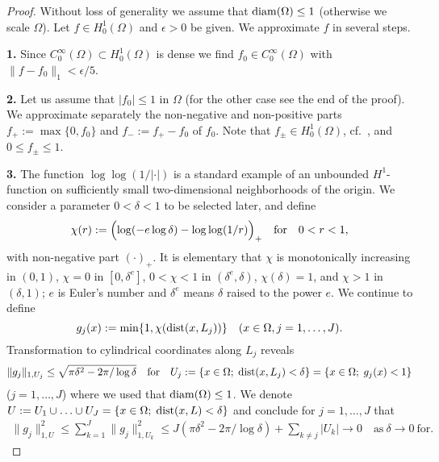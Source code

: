 \documentclass[11pt]{article}
\begin{document}
\begin{proof}
Without loss of generality we assume that $\operatorname{diam}(\Omega)\le 1$ (otherwise we
scale $\Omega$).
Let $f\in H^1_0(\Omega)$ and $\epsilon>0$ be given.
We approximate $f$ in several steps.

{\bf 1.} Since $C^\infty_0(\Omega)\subset H^1_0(\Omega)$ is dense
we find $f_0\in C^\infty_0(\Omega)$ with $\|f-f_0\|_1<\epsilon/5$.

{\bf 2.} Let us assume that $|f_0|\le 1$ in $\Omega$ (for the other case see the end of the proof).
We approximate separately the non-negative and non-positive parts
$f_+:=\max\{0,f_0\}$ and $f_-:=f_+-f_0$ of $f_0$.
Note that $f_\pm\in H^1_0(\Omega)$, cf.~\cite[Theorem~4.4(iii)]{EvansG_15_MTF},
and $0\le f_\pm\le 1$.

{\bf 3.} The function $\log\log(1/|\cdot|)$ is a standard
example of an unbounded $H^1$-function on sufficiently small
two-dimensional neighborhoods of the origin.
We consider a parameter $0<\delta<1$ to be selected later, and define
\[
   \chi(r):=\Bigl(\log(-e\log\delta)-\log\log(1/r)\Bigr)_+
   \quad\text{for}\quad 0<r<1,
\]
with non-negative part $(\cdot)_+$.
It is elementary that $\chi$ is monotonically increasing in $(0,1)$,
$\chi=0$ in $[0,\delta^e]$, $0<\chi<1$ in $(\delta^e,\delta)$, $\chi(\delta)=1$,
and $\chi>1$ in $(\delta,1)$;
$e$ is Euler's number and $\delta^e$ means $\delta$ raised to the power $e$.
We continue to define
\[
   g_j(x):=\min\{1,\chi(\operatorname{dist}(x,L_j))\} \quad (x\in\Omega, j=1,\ldots,J).
\]
Transformation to cylindrical coordinates along $L_j$ reveals
\[
   \|g_j\|_{1,U_j}\le \sqrt{\pi\delta^2-2\pi/\log\delta}\quad\text{for}\quad
   U_j:=\{x\in\Omega;\;\operatorname{dist}(x,L_j)<\delta\} = \{x\in\Omega;\; g_j(x)<1\}
\]
($j=1,\ldots,J$) where we used that $\operatorname{diam}(\Omega)\le 1$.
We denote
\(
   U:=U_1\cup\ldots\cup U_J=\{x\in\Omega;\; \operatorname{dist}(x,L)<\delta\}
\)
and conclude for $j=1,\ldots,J$ that
\begin{align} \label{loglog_bound}
   \|g_j\|_{1,U}^2 \le \sum_{k=1}^J \|g_j\|_{1,U_k}^2
   \le J(\pi\delta^2-2\pi/\log\delta) + \sum_{k\not=j} |U_k| \to 0\quad
   \text{as}\ \delta\to 0\ \text{for}.
\end{align}


\end{proof}
\end{document}
